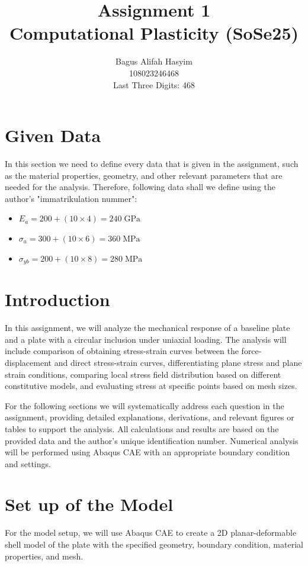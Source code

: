 \documentclass[12pt]{article}
\title{Assignment 1 \\ \large Computational Plasticity (SoSe25)}
\author{Bagus Alifah Hasyim \\ 108023246468 \\ Last Three Digits: 468}
\date{}
\begin{document}
\maketitle

\section*{Given Data}
\hspace*{2em}In this section we need to define every data that is given in the assignment, such as the material properties, geometry, 
and other relevant parameters that are needed for the analysis. Therefore, following data shall we define using the author's "immatrikulation nummer":

\begin{itemize}
    \item $E_a = 200 + (10 \times 4) = 240 \;\text{GPa}$  
    \item $\sigma_a = 300 + (10 \times 6) = 360 \;\text{MPa}$
    \item $\sigma_{yb} = 200 + (10 \times 8) = 280 \;\text{MPa}$
\end{itemize}

\section{Introduction}
\hspace*{2em}In this assignment, we will analyze the mechanical response of a baseline plate
and a plate with a circular inclusion under uniaxial loading. 
The analysis will include comparison of obtaining stress-strain curves between the force-displacement and
direct stress-strain curves, differentiating plane stress and plane strain conditions, comparing 
local stress field distribution based on different constitutive models, and evaluating stress at specific points based on mesh sizes.

\hspace*{2em}For the following sections we will systematically address each question in the assignment, 
providing detailed explanations, derivations, and relevant figures or tables to 
support the analysis. 
All calculations and results are based on the provided data and the author's unique 
identification number. Numerical analysis will be performed using Abaqus CAE with an appropriate
boundary condition and settings. 


\section{Set up of the Model}
\hspace*{2em}For the model setup, we will use Abaqus CAE to create a 2D planar-deformable shell model of the plate with the specified geometry, boundary condition, material properties, and mesh.  
\end{document}

